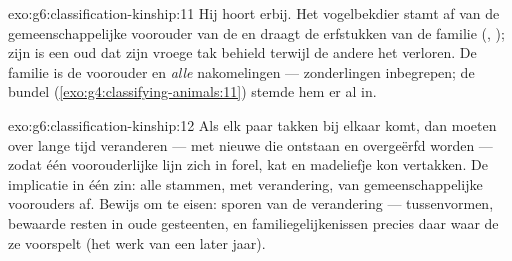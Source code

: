 \begin{solution}{exo:g6:classification-kinship:11}
Hij hoort erbij. Het vogelbekdier stamt af van de gemeenschappelijke
voorouder van de  en draagt de erfstukken van de familie
(, ); zijn  is een oud  dat zijn vroege tak behield
terwijl de andere het verloren. De familie is de voorouder en
\emph{alle} nakomelingen --- zonderlingen inbegrepen; de bundel
(\cref{exo:g4:classifying-animals:11}) stemde hem er al in.
\end{solution}

\begin{solution}{exo:g6:classification-kinship:12}
Als elk paar takken bij elkaar komt, dan moeten  over lange tijd
veranderen --- met nieuwe  die ontstaan en overgeërfd worden ---
zodat één voorouderlijke lijn zich in forel, kat en madeliefje kon
vertakken. De implicatie in één zin: alle  stammen, met
verandering, van gemeenschappelijke voorouders af. Bewijs om te eisen:
sporen van de verandering --- tussenvormen, bewaarde resten in oude
gesteenten, en familiegelijkenissen precies daar waar de  ze
voorspelt (het werk van een later jaar).
\end{solution}

